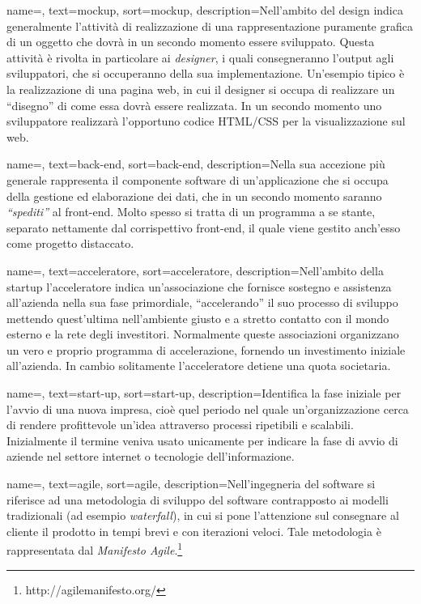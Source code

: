 {
    name=,
    text=mockup,
    sort=mockup,
    description={Nell'ambito del design indica generalmente l'attività di realizzazione di una rappresentazione puramente grafica di un oggetto che dovrà in un secondo momento essere sviluppato. Questa attività è rivolta in particolare ai \textit{designer}, i quali consegneranno l'output agli sviluppatori, che si occuperanno della sua implementazione. Un'esempio tipico è la realizzazione di una pagina web, in cui il designer si occupa di realizzare un ``disegno'' di come essa dovrà essere realizzata. In un secondo momento uno sviluppatore realizzarà l'opportuno codice HTML/CSS per la visualizzazione sul web.}
}
    
{
    name=,
    text=back-end,
    sort=back-end,
    description={Nella sua accezione più generale rappresenta il componente software di un'applicazione che si occupa della gestione ed elaborazione dei dati, che in un secondo momento saranno \textit{``spediti''} al front-end. Molto spesso si tratta di un programma a se stante, separato nettamente dal corrispettivo front-end, il quale viene gestito anch'esso come progetto distaccato.}
}

{
    name=,
    text=acceleratore,
    sort=acceleratore,
    description={Nell'ambito della startup l'acceleratore indica un'associazione che fornisce sostegno e assistenza all'azienda nella sua fase primordiale, ``accelerando'' il suo processo di sviluppo mettendo quest'ultima nell'ambiente giusto e a stretto contatto con il mondo esterno e la rete degli investitori. Normalmente queste associazioni organizzano un vero e proprio programma di accelerazione, fornendo un investimento iniziale all'azienda. In cambio solitamente l'acceleratore detiene una quota societaria.}
}

{
    name=,
    text=start-up,
    sort=start-up,
    description={Identifica la fase iniziale per l'avvio di una nuova impresa, cioè quel periodo nel quale un'organizzazione cerca di rendere profittevole un'idea attraverso processi ripetibili e scalabili. Inizialmente il termine veniva usato unicamente per indicare la fase di avvio di aziende nel settore internet o tecnologie dell'informazione.}
}

{
    name=,
    text=agile,
    sort=agile,
    description={Nell'ingegneria del software si riferisce ad una metodologia di sviluppo del software contrapposto ai modelli tradizionali (ad esempio \textit{waterfall}), in cui si pone l'attenzione sul consegnare al cliente il prodotto in tempi brevi e con iterazioni veloci. Tale metodologia è rappresentata dal \textit{Manifesto Agile}.\footnote{http://agilemanifesto.org/}}
}

